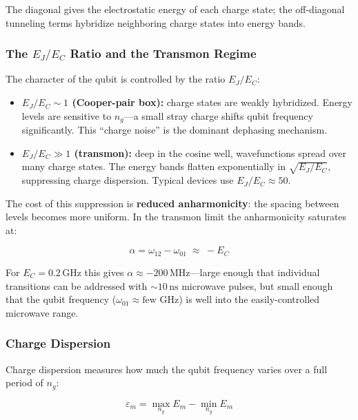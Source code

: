\documentclass[11pt]{article}
\begin{document}
The diagonal gives the electrostatic energy of each charge state; the off-diagonal tunneling
terms hybridize neighboring charge states into energy bands.

\subsubsection{The $E_J/E_C$ Ratio and the Transmon Regime}

The character of the qubit is controlled by the ratio $E_J/E_C$:

\begin{itemize}
  \item \textbf{$E_J/E_C \sim 1$ (Cooper-pair box):} charge states are weakly hybridized.
        Energy levels are sensitive to $n_g$---a small stray charge shifts qubit frequency
        significantly. This ``charge noise'' is the dominant dephasing mechanism.
  \item \textbf{$E_J/E_C \gg 1$ (transmon):} deep in the cosine well, wavefunctions spread
        over many charge states. The energy bands flatten exponentially in
        $\sqrt{E_J/E_C}$, suppressing charge dispersion. Typical devices use
        $E_J/E_C \approx 50$.
\end{itemize}

The cost of this suppression is \textbf{reduced anharmonicity}: the spacing between levels
becomes more uniform. In the transmon limit the anharmonicity saturates at:

\begin{equation}
  \alpha = \omega_{12} - \omega_{01} \;\approx\; -E_C
\end{equation}

For $E_C = 0.2\,\text{GHz}$ this gives $\alpha \approx -200\,\text{MHz}$---large enough that
individual transitions can be addressed with ${\sim}10\,\text{ns}$ microwave pulses, but small
enough that the qubit frequency ($\omega_{01} \approx \text{few GHz}$) is well into the
easily-controlled microwave range.

\subsubsection{Charge Dispersion}

Charge dispersion measures how much the qubit frequency varies over a full period of $n_g$:

\begin{equation}
  \varepsilon_m = \max_{n_g} E_m - \min_{n_g} E_m
\end{equation}
\end{document}
